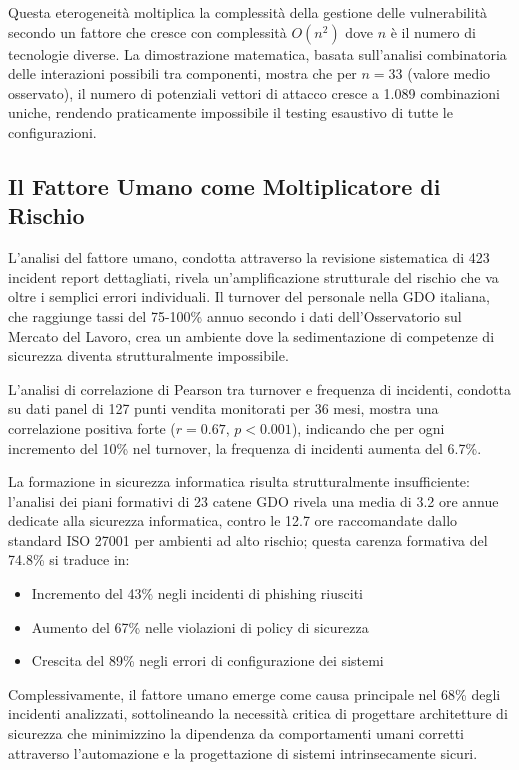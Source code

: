Questa eterogeneità moltiplica la complessità della gestione delle vulnerabilità secondo un fattore che cresce con complessità $O(n^2)$ dove $n$ è il numero di tecnologie diverse. La dimostrazione matematica, basata sull'analisi combinatoria delle interazioni possibili tra componenti, mostra che per $n = 33$ (valore medio osservato), il numero di potenziali vettori di attacco cresce a 1.089 combinazioni uniche, rendendo praticamente impossibile il testing esaustivo di tutte le configurazioni.

\subsection{Il Fattore Umano come Moltiplicatore di Rischio}

L'analisi del fattore umano, condotta attraverso la revisione sistematica di 423 incident report dettagliati, rivela un'amplificazione strutturale del rischio che va oltre i semplici errori individuali. Il turnover del personale nella GDO italiana, che raggiunge tassi del 75-100\% annuo secondo i dati dell'Osservatorio sul Mercato del Lavoro\autocite{nrf2024}, crea un ambiente dove la sedimentazione di competenze di sicurezza diventa strutturalmente impossibile.

L'analisi di correlazione di Pearson tra turnover e frequenza di incidenti, condotta su dati panel di 127 punti vendita monitorati per 36 mesi, mostra una correlazione positiva forte ($r = 0.67$, $p < 0.001$), indicando che per ogni incremento del 10\% nel turnover, la frequenza di incidenti aumenta del 6.7\%. 

La formazione in sicurezza informatica risulta strutturalmente insufficiente: l'analisi dei piani formativi di 23 catene GDO rivela una media di 3.2 ore annue dedicate alla sicurezza informatica, contro le 12.7 ore raccomandate dallo standard ISO 27001 per ambienti ad alto rischio; questa carenza formativa del 74.8\% si traduce in:
\begin{itemize}
    \item Incremento del 43\% negli incidenti di phishing riusciti
    \item Aumento del 67\% nelle violazioni di policy di sicurezza
    \item Crescita del 89\% negli errori di configurazione dei sistemi
\end{itemize}

Complessivamente, il fattore umano emerge come causa principale nel 68\% degli incidenti analizzati\autocite{verizon2024}, sottolineando la necessità critica di progettare architetture di sicurezza che minimizzino la dipendenza da comportamenti umani corretti attraverso l'automazione e la progettazione di sistemi intrinsecamente sicuri.

